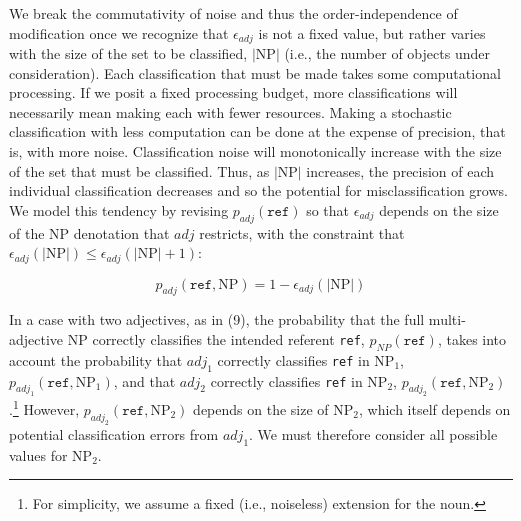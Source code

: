 \documentclass[preprint,authoryear]{elsarticle}\frenchspacing
\newcommand{\gcs}[1]{\textcolor{blue}{[gcs: #1]}}
\begin{document}
We break the commutativity of noise and thus the order-independence of modification once we recognize that $\epsilon_{adj}$ is not a fixed value, but rather varies with the size of the set to be classified, $|\textrm{NP}|$ (i.e., the number of objects under consideration). Each classification that must be made takes some computational processing. If we posit a fixed processing budget, more classifications will necessarily mean making each with fewer resources. Making a stochastic classification with less computation can be done at the expense of precision, that is, with more noise. Classification noise will monotonically increase with the size of the set that must be classified.
Thus, as $|\textrm{NP}|$ increases, the precision of each individual classification decreases and so the potential for misclassification grows. We model this tendency by revising $p_{adj}(\texttt{ref})$ so that $\epsilon_{adj}$ depends on the size of the NP denotation that $adj$ restricts, with the constraint that $\epsilon_{adj}(|\textrm{NP}|) \leq \epsilon_{adj}(|\textrm{NP}|+1)$:

\begin{equation}
p_{adj}(\texttt{ref},\textrm{NP}) = 1-\epsilon_{adj}(|\textrm{NP}|)
\end{equation}


In a case with two adjectives, as in (9), the probability that the full multi-adjective NP correctly classifies the intended referent \texttt{ref}, $p_{N\!P}(\texttt{ref})$, takes into account the probability that $adj_1$ correctly classifies \texttt{ref} in NP$_1$, $p_{adj_1}(\texttt{ref},\textrm{NP}_1)$, and that $adj_2$ correctly classifies \texttt{ref} in NP$_2$, $p_{adj_2}(\texttt{ref},\textrm{NP}_2)$.\footnote{For simplicity, we assume a fixed (i.e., noiseless) extension for the noun.} However, $p_{adj_2}(\texttt{ref},\textrm{NP}_2)$ depends on the size of NP$_2$, which itself depends on potential classification errors from $adj_1$. We must therefore consider all possible values for NP$_2$.
\end{document}
